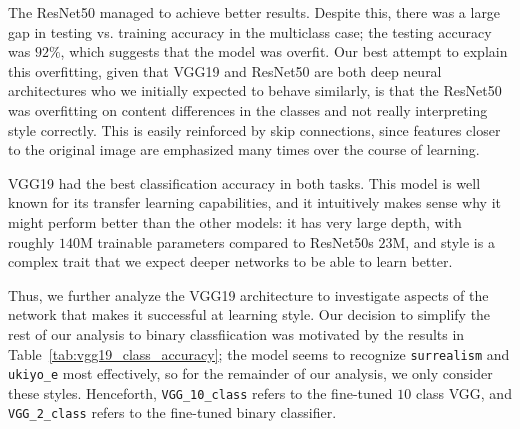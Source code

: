\documentclass[twocolumn]{article}
\begin{document}

The ResNet50 managed to achieve better results. Despite this, there was a large gap in testing vs. training accuracy in the multiclass case; the testing accuracy was $92\%$, which suggests that the model was overfit. Our best attempt to explain this overfitting, given that VGG19 and ResNet50 are both deep neural architectures who we initially expected to behave similarly, is that the ResNet50 was overfitting on content differences in the classes and not really interpreting style correctly. This is easily reinforced by skip connections, since features closer to the original image are emphasized many times over the course of learning.

VGG19 had the best classification accuracy in both tasks. This model is well known for its transfer learning capabilities, and it intuitively makes sense why it might perform better than the other models: it has very large depth, with roughly $140$M trainable parameters compared to ResNet50s $23$M, and style is a complex trait that we expect deeper networks to be able to learn better. 


Thus, we further analyze the VGG19 architecture to investigate aspects of the network that makes it successful at learning style. Our decision to simplify the rest of our analysis to binary classfiication was motivated by the results in Table~\ref{tab:vgg19_class_accuracy}; the model seems to recognize \verb|surrealism| and \verb|ukiyo_e| most effectively, so for the remainder of our analysis, we only consider these styles. Henceforth, \verb|VGG_10_class| refers to the fine-tuned $10$ class VGG, and \verb|VGG_2_class| refers to the fine-tuned binary classifier.
\end{document}
